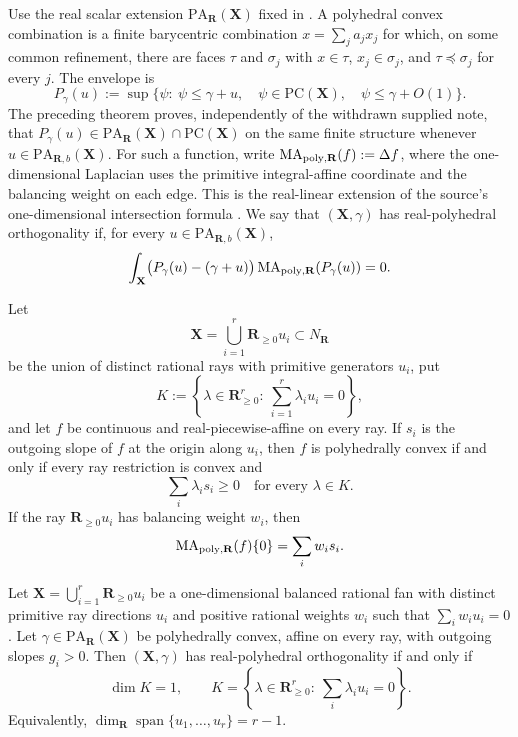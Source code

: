 
Use the real scalar extension
$\mathrm{PA}_{\mathbf R}(\mathbf X)$ fixed in
.  A
polyhedral convex combination is a finite barycentric combination
$x=\sum_j a_jx_j$ for which, on some common refinement, there are faces
$\tau$ and $\sigma_j$ with $x\in\tau$, $x_j\in\sigma_j$, and
$\tau\preceq\sigma_j$ for every $j$.  The envelope is
\[
 P_\gamma(u):=\sup\{\psi:\ \psi\leq\gamma+u,\quad
   \psi\in\mathrm{PC}(\mathbf X),\quad
   \psi\leq\gamma+O(1)\}.
\]
The preceding theorem proves, independently of the withdrawn supplied note, that
$P_\gamma(u)\in\mathrm{PA}_{\mathbf R}(\mathbf X)\cap
\mathrm{PC}(\mathbf X)$ on the same finite structure whenever
$u\in\mathrm{PA}_{\mathbf R,b}(\mathbf X)$.  For such a function, write
$\operatorname{MA}_{\mathrm{poly},\mathbf R}(f):=\Delta f$, where the
one-dimensional Laplacian uses the primitive integral-affine coordinate
and the balancing weight on each edge.  This is the real-linear extension
of the source's one-dimensional intersection formula
\cite[Definition~6.15 and Proposition~6.17]{BMPS26}.
We say that $(\mathbf X,\gamma)$ has real-polyhedral orthogonality if, for
every $u\in\mathrm{PA}_{\mathbf R,b}(\mathbf X)$,
\[
 \int_{\mathbf X}
 \bigl(P_\gamma(u)-(\gamma+u)\bigr)
 \operatorname{MA}_{\mathrm{poly},\mathbf R}(P_\gamma(u))=0.
\]

\begin{lemma}
\label{lem:frontier-polyhedral-one-vertex-convexity}
Let
\[
 \mathbf X=\bigcup_{i=1}^{r}\mathbf R_{\geq0}u_i
 \subset N_{\mathbf R}
\]
be the union of distinct rational rays with primitive generators $u_i$, put
\[
 K:=\left\{\lambda\in\mathbf R_{\geq0}^{r}:\
       \sum_{i=1}^{r}\lambda_i u_i=0\right\},
\]
and let $f$ be continuous and real-piecewise-affine on every ray.  If $s_i$
is the outgoing slope of $f$ at the origin along $u_i$, then $f$ is
polyhedrally convex if and only if every ray restriction is convex and
\[
                    \sum_i\lambda_i s_i\geq0
                    \quad\text{for every }\lambda\in K.
\]
If the ray $\mathbf R_{\geq0}u_i$ has balancing weight $w_i$, then
\[
             \operatorname{MA}_{\mathrm{poly},\mathbf R}(f)\{0\}=\sum_iw_i s_i.
\]
\end{lemma}

\begin{theorem}
\label{thm:frontier-polyhedral-one-vertex-orthogonality}
Let
$
 \mathbf X=\bigcup_{i=1}^{r}\mathbf R_{\geq0}u_i
$
be a one-dimensional balanced rational fan with distinct primitive ray
directions $u_i$ and positive rational weights $w_i$ such that
$
 \sum_iw_i u_i=0
$.
Let $\gamma\in\mathrm{PA}_{\mathbf R}(\mathbf X)$ be polyhedrally convex,
affine on every ray, with outgoing slopes $g_i>0$.  Then
$(\mathbf X,\gamma)$ has real-polyhedral orthogonality if and only if
\[
 \dim K=1,
 \qquad
 K=\left\{\lambda\in\mathbf R_{\geq0}^{r}:\
       \sum_i\lambda_i u_i=0\right\}.
\]
Equivalently,
$
 \dim_{\mathbf R}\operatorname{span}\{u_1,\ldots,u_r\}=r-1
$.
\end{theorem}

